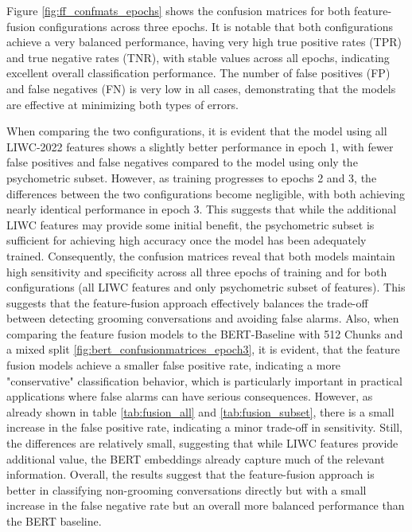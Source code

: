 Figure \ref{fig:ff_confmats_epochs} shows the confusion matrices for both feature-fusion configurations across three epochs. It is notable that both configurations achieve a very balanced performance, having very high true positive rates (TPR) and true negative rates (TNR), with stable values across all epochs, indicating excellent overall classification performance. The number of false positives (FP) and false negatives (FN) is very low in all cases, demonstrating that the models are effective at minimizing both types of errors. 

When comparing the two configurations, it is evident that the model using all LIWC-2022 features shows a slightly better performance in epoch 1, with fewer false positives and false negatives compared to the model using only the psychometric subset. However, as training progresses to epochs 2 and 3, the differences between the two configurations become negligible, with both achieving nearly identical performance in epoch 3. This suggests that while the additional LIWC features may provide some initial benefit, the psychometric subset is sufficient for achieving high accuracy once the model has been adequately trained. Consequently, the confusion matrices reveal that both models maintain high sensitivity and specificity across all three epochs of training and for both configurations (all LIWC features and only psychometric subset of features). This suggests that the feature-fusion approach effectively balances the trade-off between detecting grooming conversations and avoiding false alarms. Also, when comparing the feature fusion models to  the BERT-Baseline with 512 Chunks and a mixed split \ref{fig:bert_confusionmatrices_epoch3}, it is evident, that the feature fusion models achieve a smaller false positive rate, indicating a more "conservative" classification behavior, which is particularly important in practical applications where false alarms can have serious consequences. However, as already shown in table \ref{tab:fusion_all} and \ref{tab:fusion_subset}, there is a small increase in the false positive rate, indicating a minor trade-off in sensitivity. Still, the differences are relatively small, suggesting that while LIWC features provide additional value, the BERT embeddings already capture much of the relevant information. Overall, the results suggest that the feature-fusion approach is better in classifying non-grooming conversations directly but with a small increase in the false negative rate but an overall more balanced performance than the BERT baseline.


